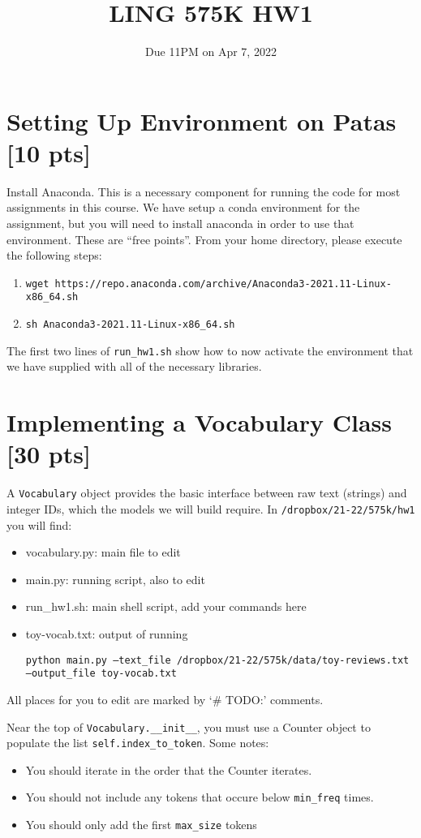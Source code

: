 \documentclass[11pt]{article}
\begin{document}
\title{LING 575K HW1}
\date{\vspace{-0.2in}Due 11PM on Apr 7, 2022}
\maketitle


\section{Setting Up Environment on Patas [10 pts]}

Install Anaconda. This is a necessary component for running the code for most assignments in this course.  We have setup a conda environment for the assignment, but you will need to install anaconda in order to use that environment.  These are ``free points''.  From your home directory, please execute the following steps:
\begin{enumerate}
	\item \texttt{wget https://repo.anaconda.com/archive/Anaconda3-2021.11-Linux-x86\_64.sh}
	\item \texttt{sh Anaconda3-2021.11-Linux-x86\_64.sh}
\end{enumerate}
The first two lines of \texttt{run\_hw1.sh} show how to now activate the environment that we have supplied with all of the necessary libraries.


\section{Implementing a Vocabulary Class [30 pts]}

A \texttt{Vocabulary} object provides the basic interface between raw text (strings) and integer IDs, which the models we will build require.  In \texttt{/dropbox/21-22/575k/hw1} you will find:
\begin{itemize}
  \item vocabulary.py: main file to edit
  \item main.py: running script, also to edit
  \item run\_hw1.sh: main shell script, add your commands here
  \item toy-vocab.txt: output of running 
  
    \texttt{python main.py --text\_file /dropbox/21-22/575k/data/toy-reviews.txt --output\_file toy-vocab.txt}
\end{itemize}
All places for you to edit are marked by `\# TODO:' comments.

\vspace{2em}
 Near the top of \texttt{Vocabulary.\_\_init\_\_}, you must use a Counter object to populate the list \texttt{self.index\_to\_token}.  Some notes:
\begin{itemize}
  \item You should iterate in the order that the Counter iterates.
  \item You should not include any tokens that occure below \texttt{min\_freq} times.
  \item You should only add the first \texttt{max\_size} tokens
\end{itemize}
\end{document}
